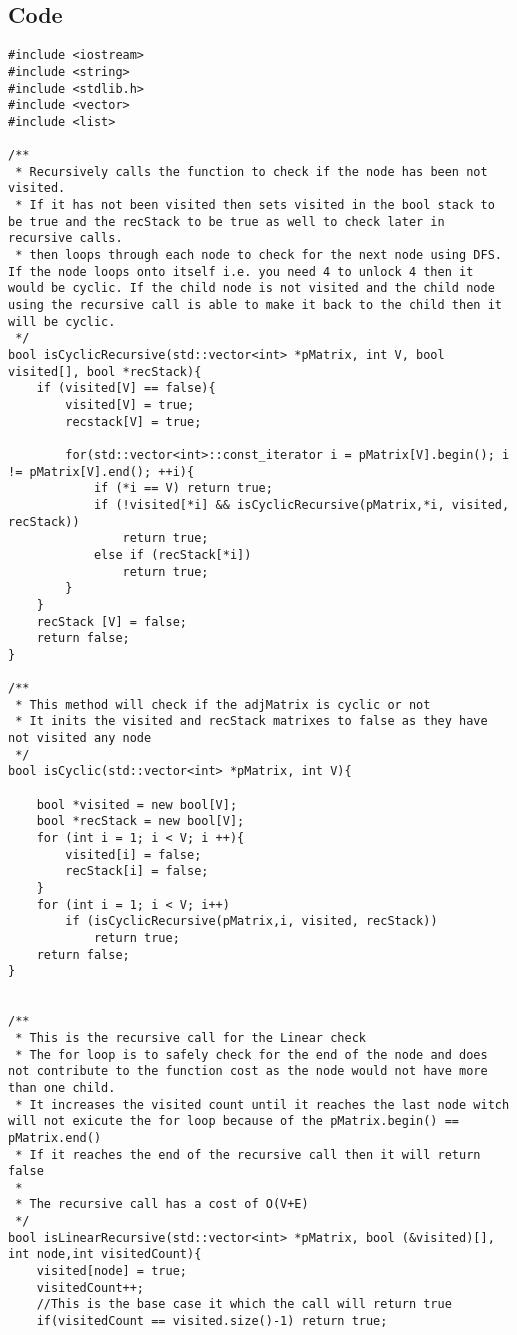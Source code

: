 \documentclass[11pt]{article}
\begin{document}
\subsection{Code}
\begin{lstlisting}[frame=single]
#include <iostream>
#include <string>
#include <stdlib.h>
#include <vector>
#include <list>

/**
 * Recursively calls the function to check if the node has been not visited.
 * If it has not been visited then sets visited in the bool stack to be true and the recStack to be true as well to check later in recursive calls.
 * then loops through each node to check for the next node using DFS. If the node loops onto itself i.e. you need 4 to unlock 4 then it would be cyclic. If the child node is not visited and the child node using the recursive call is able to make it back to the child then it will be cyclic.
 */
bool isCyclicRecursive(std::vector<int> *pMatrix, int V, bool visited[], bool *recStack){
    if (visited[V] == false){
        visited[V] = true;
        recstack[V] = true;
                
        for(std::vector<int>::const_iterator i = pMatrix[V].begin(); i != pMatrix[V].end(); ++i){
            if (*i == V) return true;
            if (!visited[*i] && isCyclicRecursive(pMatrix,*i, visited, recStack))
                return true;
            else if (recStack[*i])
                return true; 
        }
    }
    recStack [V] = false;
    return false;
}

/**
 * This method will check if the adjMatrix is cyclic or not
 * It inits the visited and recStack matrixes to false as they have not visited any node
 */
bool isCyclic(std::vector<int> *pMatrix, int V){  
    
    bool *visited = new bool[V];
    bool *recStack = new bool[V];
    for (int i = 1; i < V; i ++){
        visited[i] = false;
        recStack[i] = false;
    }   
    for (int i = 1; i < V; i++)
        if (isCyclicRecursive(pMatrix,i, visited, recStack))
            return true;
    return false;   
}


/**
 * This is the recursive call for the Linear check
 * The for loop is to safely check for the end of the node and does not contribute to the function cost as the node would not have more than one child.
 * It increases the visited count until it reaches the last node witch will not exicute the for loop because of the pMatrix.begin() == pMatrix.end()
 * If it reaches the end of the recursive call then it will return false
 *
 * The recursive call has a cost of O(V+E)
 */
bool isLinearRecursive(std::vector<int> *pMatrix, bool (&visited)[], int node,int visitedCount){
    visited[node] = true;
    visitedCount++;
    //This is the base case it which the call will return true
    if(visitedCount == visited.size()-1) return true;
     

\end{lstlisting}
\end{document}
